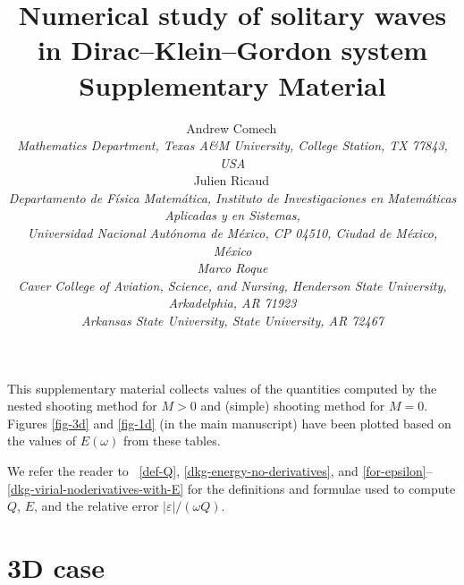 \documentclass[12pt]{extarticle}
\theoremstyle{plain}
\theoremstyle{remark}
\renewcommand{\theequation}{\thesection.\arabic{equation}}
\begin{document}
\renewcommand{\theequation}{\thesection.\arabic{equation}}
\newcommand{\sect}[1]{\setcounter{equation}{0}\section{#1}}


\title{Numerical study
of solitary waves\\in
Dirac--Klein--Gordon system\\
Supplementary Material
}


\author{
Andrew Comech\,
\\
{\small\it
Mathematics Department,
Texas A\&M University, College Station, TX 77843, USA}
\\[1ex]
Julien Ricaud\,
\\
\small\it
Departamento de F\'{i}sica Matem\'{a}tica,
Instituto de Investigaciones en Matem\'aticas Aplicadas y en Sistemas,
\\
\small\it
Universidad Nacional Aut\'onoma de M\'exico, CP 04510, Ciudad de M\'exico, M\'exico
\\[1ex]
Marco Roque
\\
\small\it
Caver College of Aviation, 
Science, and Nursing,
Henderson State University, Arkadelphia, AR 71923
\\
\small\it
Arkansas State University,
State University, AR 72467
}


\maketitle

This supplementary material collects values of the
quantities computed by the nested shooting method
for $M>0$ and (simple) shooting method for $M=0$. Figures \ref{fig-3d} and \ref{fig-1d} (in the main manuscript) have been plotted based on the values of $E(\omega)$ from these tables.

We refer the reader to
~\eqref{def-Q},
\eqref{dkg-energy-no-derivatives}, and 
\eqref{for-epsilon}--\eqref{dkg-virial-noderivatives-with-E}
for the definitions and formulae used 
to compute
$Q$, $E$, and the relative error $|\varepsilon|/(\omega Q)$.


\renewcommand\thetable{S\arabic{table}}\setcounter{table}{0}
\section*{3D case}
\end{document}
